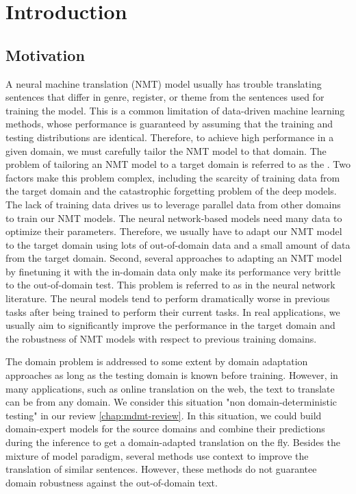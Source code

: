 \chapter{Introduction}
\section{Motivation}
A neural machine translation (NMT) model usually has trouble translating sentences that differ in genre, register, or theme from the sentences used for training the model. This is a common limitation of data-driven machine learning methods, whose performance is guaranteed by assuming that the training and testing distributions are identical. Therefore, to achieve high performance in a given domain, we must carefully tailor the NMT model to that domain. The problem of tailoring an NMT model to a target domain is referred to as the . Two factors make this problem complex, including the scarcity of training data from the target domain and the catastrophic forgetting problem of the deep models. The lack of training data drives us to leverage parallel data from other domains to train our NMT models. The neural network-based models need many data to optimize their parameters. Therefore, we usually have to adapt our NMT model to the target domain using lots of out-of-domain data and a small amount of data from the target domain. Second, several approaches to adapting an NMT model by finetuning it with the in-domain data only make its performance very brittle to the out-of-domain test. This problem is referred to as  in the neural network literature. The neural models tend to perform dramatically worse in previous tasks after being trained to perform their current tasks. In real applications, we usually aim to significantly improve the performance in the target domain and the robustness of NMT models with respect to previous training domains.

The domain problem is addressed to some extent by domain adaptation approaches as long as the testing domain is known before training. However, in many applications, such as online translation on the web, the text to translate can be from any domain. We consider this situation "non domain-deterministic testing" in our review \ref{chap:mdmt-review}. In this situation, we could build domain-expert models for the source domains and combine their predictions during the inference \citep{Saunders19domain} to get a domain-adapted translation on the fly. Besides the mixture of model paradigm, several methods use context to improve the translation of similar sentences. However, these methods do not guarantee domain robustness against the out-of-domain text.

